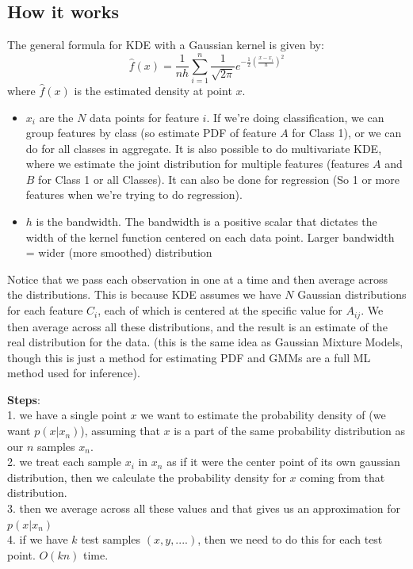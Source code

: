 \documentclass[12pt]{article}
\begin{document}
\subsection{How it works}
The general formula for KDE with a Gaussian kernel is given by:
\[
\hat{f}(x) = \frac{1}{nh} \sum_{i=1}^{n} \frac{1}{\sqrt{2\pi}} e^{-\frac{1}{2}\left(\frac{x - x_i}{h}\right)^2}
\]
where $\hat{f}(x)$ is the estimated density at point $x$.
\begin{itemize}
    \item $x_i$ are the $N$ data points for feature $i$. If we're doing classification, we can group features by class (so estimate PDF of feature $A$ for Class 1), or we can do for all classes in aggregate. It is also possible to do multivariate KDE, where we estimate the joint distribution for multiple features (features $A$ and $B$ for Class 1 or all Classes). It can also be done for regression (So 1 or more features when we're trying to do regression).
    \item $h$ is the bandwidth. The bandwidth is a positive scalar that dictates the width of the kernel function centered on each data point. Larger bandwidth = wider (more smoothed) distribution
\end{itemize}
Notice that we pass each observation in one at a time and then average across the distributions. This is because KDE assumes we have $N$ Gaussian distributions for each feature $C_i$, each of which is centered at the specific value for $A_{ij}$. We then average across all these distributions, and the result is an estimate of the real distribution for the data. (this is the same idea as Gaussian Mixture Models, though this is just a method for estimating PDF and GMMs are a full ML method used for inference).

\textbf{Steps}:\\
1.  we have a single point \(x\) we want to estimate the probability density of (we want \(p(x | x_n)\)), assuming that \(x\) is a part of the same probability distribution as our \(n\) samples \(x_n\).\\
2. we treat each sample \(x_i\) in \(x_n\) as if it were the center point of its own gaussian distribution, then we calculate the probability density for \(x\) coming from that distribution.\\
3. then we average across all these values and that gives us an approximation for \(p(x | x_n)\)\\
4. if we have \(k\) test samples \((x, y, ....)\), then we need to do this for each test point. \(O(kn)\) time. 
\end{document}
